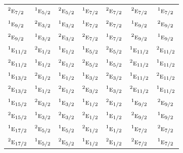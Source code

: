 \documentclass[10pt,a4paper]{article}
\numberwithin{equation}{section}
\newcommand{\irr}[1]{\text{\normalfont\scshape #1}}
\newcommand{\conjpair}[1]{{}^{#1}}
\begin{document}
{\begin{longtable}{@{}lcccccc@{}}
$\conjpair{2}\irr{e}_{7/2}$ & $\conjpair{1}\irr{e}_{5/2}$ & $\conjpair{2}\irr{e}_{5/2}$ & $\conjpair{1}\irr{e}_{7/2}$ & $\conjpair{2}\irr{e}_{7/2}$ & $\conjpair{2}\irr{e}_{7/2}$ & $\conjpair{1}\irr{e}_{7/2}$\\
$\conjpair{1}\irr{e}_{9/2}$ & $\conjpair{2}\irr{e}_{3/2}$ & $\conjpair{1}\irr{e}_{3/2}$ & $\conjpair{1}\irr{e}_{7/2}$ & $\conjpair{2}\irr{e}_{7/2}$ & $\conjpair{1}\irr{e}_{9/2}$ & $\conjpair{2}\irr{e}_{9/2}$\\
$\conjpair{2}\irr{e}_{9/2}$ & $\conjpair{1}\irr{e}_{3/2}$ & $\conjpair{2}\irr{e}_{3/2}$ & $\conjpair{2}\irr{e}_{7/2}$ & $\conjpair{1}\irr{e}_{7/2}$ & $\conjpair{2}\irr{e}_{9/2}$ & $\conjpair{1}\irr{e}_{9/2}$\\
$\conjpair{1}\irr{e}_{11/2}$ & $\conjpair{2}\irr{e}_{1/2}$ & $\conjpair{1}\irr{e}_{1/2}$ & $\conjpair{1}\irr{e}_{5/2}$ & $\conjpair{2}\irr{e}_{5/2}$ & $\conjpair{1}\irr{e}_{11/2}$ & $\conjpair{2}\irr{e}_{11/2}$\\
$\conjpair{2}\irr{e}_{11/2}$ & $\conjpair{1}\irr{e}_{1/2}$ & $\conjpair{2}\irr{e}_{1/2}$ & $\conjpair{2}\irr{e}_{5/2}$ & $\conjpair{1}\irr{e}_{5/2}$ & $\conjpair{2}\irr{e}_{11/2}$ & $\conjpair{1}\irr{e}_{11/2}$\\
$\conjpair{1}\irr{e}_{13/2}$ & $\conjpair{2}\irr{e}_{1/2}$ & $\conjpair{1}\irr{e}_{1/2}$ & $\conjpair{1}\irr{e}_{3/2}$ & $\conjpair{2}\irr{e}_{3/2}$ & $\conjpair{1}\irr{e}_{11/2}$ & $\conjpair{2}\irr{e}_{11/2}$\\
$\conjpair{2}\irr{e}_{13/2}$ & $\conjpair{1}\irr{e}_{1/2}$ & $\conjpair{2}\irr{e}_{1/2}$ & $\conjpair{2}\irr{e}_{3/2}$ & $\conjpair{1}\irr{e}_{3/2}$ & $\conjpair{2}\irr{e}_{11/2}$ & $\conjpair{1}\irr{e}_{11/2}$\\
$\conjpair{1}\irr{e}_{15/2}$ & $\conjpair{2}\irr{e}_{3/2}$ & $\conjpair{1}\irr{e}_{3/2}$ & $\conjpair{1}\irr{e}_{1/2}$ & $\conjpair{2}\irr{e}_{1/2}$ & $\conjpair{1}\irr{e}_{9/2}$ & $\conjpair{2}\irr{e}_{9/2}$\\
$\conjpair{2}\irr{e}_{15/2}$ & $\conjpair{1}\irr{e}_{3/2}$ & $\conjpair{2}\irr{e}_{3/2}$ & $\conjpair{2}\irr{e}_{1/2}$ & $\conjpair{1}\irr{e}_{1/2}$ & $\conjpair{2}\irr{e}_{9/2}$ & $\conjpair{1}\irr{e}_{9/2}$\\
$\conjpair{1}\irr{e}_{17/2}$ & $\conjpair{2}\irr{e}_{5/2}$ & $\conjpair{1}\irr{e}_{5/2}$ & $\conjpair{2}\irr{e}_{1/2}$ & $\conjpair{1}\irr{e}_{1/2}$ & $\conjpair{1}\irr{e}_{7/2}$ & $\conjpair{2}\irr{e}_{7/2}$\\
$\conjpair{2}\irr{e}_{17/2}$ & $\conjpair{1}\irr{e}_{5/2}$ & $\conjpair{2}\irr{e}_{5/2}$ & $\conjpair{1}\irr{e}_{1/2}$ & $\conjpair{2}\irr{e}_{1/2}$ & $\conjpair{2}\irr{e}_{7/2}$ & $\conjpair{1}\irr{e}_{7/2}$\\

\end{longtable}}
\end{document}
